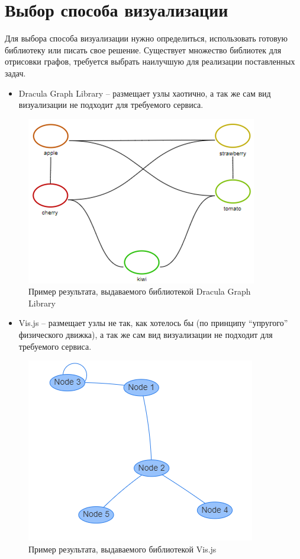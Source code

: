 \section{Выбор способа визуализации} \label{ch4:sec3}
Для выбора способа визуализации нужно определиться, использовать готовую библиотеку или писать свое решение.
Существует множество библиотек для отрисовки графов, требуется выбрать наилучшую для реализации поставленных задач.
\begin{itemize}
\item Dracula Graph Library – размещает узлы хаотично, а так же сам вид визуализации не подходит для требуемого сервиса.
\end{itemize}
\begin{figure}[ht!] 
	\center
	\includegraphics [scale=0.27] {my_folder/images/my/13}
	\caption{Пример результата, выдаваемого библиотекой Dracula Graph Library} 
	\label{fig:13}  
\end{figure}
\begin{itemize}
\item Vis.js – размещает узлы не так, как хотелось бы (по принципу “упругого” физического движка), а так же сам вид визуализации не подходит для требуемого сервиса.
\end{itemize}
\begin{figure}[ht!] 
	\center
	\includegraphics [scale=0.27] {my_folder/images/my/14}
	\caption{Пример результата, выдаваемого библиотекой Vis.js} 
	\label{fig:14}  
\end{figure}

